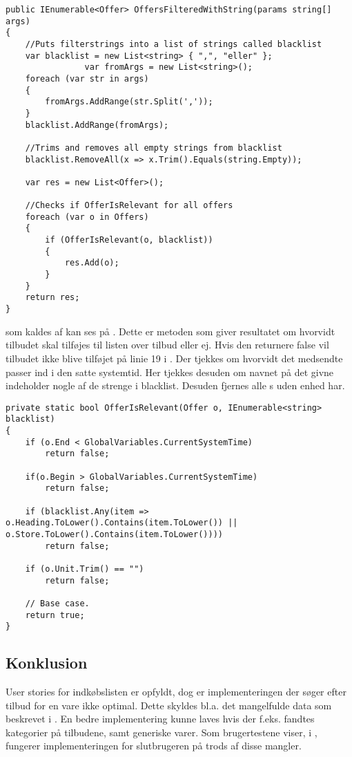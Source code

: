 \begin{lstlisting}[caption={\class{OffersFilteredByUserPref} er metoden, der filtrerer \class{Offers} på baggrund af uønskede strenge.}, label=OffersFilteredByUserPrefs] 
public IEnumerable<Offer> OffersFilteredWithString(params string[] args)
{
	//Puts filterstrings into a list of strings called blacklist
    var blacklist = new List<string> { ",", "eller" };
                var fromArgs = new List<string>();
    foreach (var str in args)
    {
        fromArgs.AddRange(str.Split(','));
    }
    blacklist.AddRange(fromArgs);
    
    //Trims and removes all empty strings from blacklist
    blacklist.RemoveAll(x => x.Trim().Equals(string.Empty));

    var res = new List<Offer>();

	//Checks if OfferIsRelevant for all offers
    foreach (var o in Offers)
    {
        if (OfferIsRelevant(o, blacklist))
        {
            res.Add(o);
        }
    }
    return res;
}
\end{lstlisting}

 som kaldes af  kan ses på . Dette er metoden som giver resultatet om hvorvidt tilbudet skal tilføjes til listen over tilbud eller ej. 
Hvis den returnere false vil tilbudet ikke blive tilføjet på linie 19 i .
Der tjekkes om hvorvidt det medsendte   passer ind i den satte systemtid.
Her tjekkes desuden om navnet på det givne  indeholder nogle af de strenge i blacklist.
Desuden fjernes alle s uden enhed har.

\begin{lstlisting}[caption={\class{OffersFilteredByUserPrefs}, sørger for at tilbudet som modtages som input overholder de forskellige krav sat i blacklisten.}, label=OfferIsRelevant]
private static bool OfferIsRelevant(Offer o, IEnumerable<string> blacklist)
{
    if (o.End < GlobalVariables.CurrentSystemTime)
        return false;

    if(o.Begin > GlobalVariables.CurrentSystemTime)
        return false;

    if (blacklist.Any(item => o.Heading.ToLower().Contains(item.ToLower()) || o.Store.ToLower().Contains(item.ToLower())))
        return false;

    if (o.Unit.Trim() == "")
        return false;

    // Base case.
    return true;
}
\end{lstlisting}

\subsection{Konklusion}

User stories for indkøbslisten er opfyldt, dog er implementeringen der søger efter tilbud for en vare ikke optimal.
Dette skyldes bl.a. det mangelfulde data som beskrevet i .
En bedre implementering kunne laves hvis der f.eks. fandtes kategorier på tilbudene, samt generiske varer.
Som brugertestene viser, i , fungerer implementeringen for slutbrugeren på trods af disse mangler.
